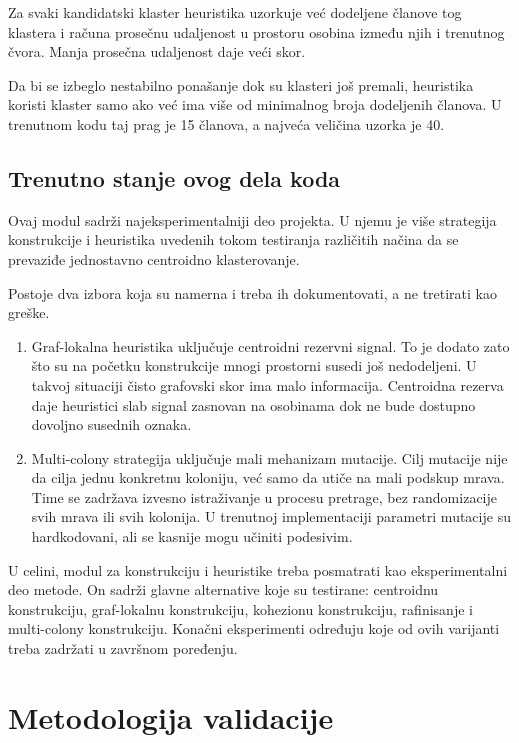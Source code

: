 \documentclass[11pt]{article}
\begin{document}
Za svaki kandidatski klaster heuristika uzorkuje već dodeljene članove tog klastera i računa prosečnu udaljenost u prostoru osobina između njih i trenutnog čvora. Manja prosečna udaljenost daje veći skor.

Da bi se izbeglo nestabilno ponašanje dok su klasteri još premali, heuristika koristi klaster samo ako već ima više od minimalnog broja dodeljenih članova. U trenutnom kodu taj prag je 15 članova, a najveća veličina uzorka je 40.

\subsection{Trenutno stanje ovog dela koda}
Ovaj modul sadrži najeksperimentalniji deo projekta. U njemu je više strategija konstrukcije i heuristika uvedenih tokom testiranja različitih načina da se prevaziđe jednostavno centroidno klasterovanje.

Postoje dva izbora koja su namerna i treba ih dokumentovati, a ne tretirati kao greške.
\begin{enumerate}
  \item Graf-lokalna heuristika uključuje centroidni rezervni signal. To je dodato zato što su na početku konstrukcije mnogi prostorni susedi još nedodeljeni. U takvoj situaciji čisto grafovski skor ima malo informacija. Centroidna rezerva daje heuristici slab signal zasnovan na osobinama dok ne bude dostupno dovoljno susednih oznaka.
  \item Multi-colony strategija uključuje mali mehanizam mutacije. Cilj mutacije nije da cilja jednu konkretnu koloniju, već samo da utiče na mali podskup mrava. Time se zadržava izvesno istraživanje u procesu pretrage, bez randomizacije svih mrava ili svih kolonija. U trenutnoj implementaciji parametri mutacije su hardkodovani, ali se kasnije mogu učiniti podesivim.
\end{enumerate}

U celini, modul za konstrukciju i heuristike treba posmatrati kao eksperimentalni deo metode. On sadrži glavne alternative koje su testirane: centroidnu konstrukciju, graf-lokalnu konstrukciju, kohezionu konstrukciju, rafinisanje i multi-colony konstrukciju. Konačni eksperimenti određuju koje od ovih varijanti treba zadržati u završnom poređenju.

\section{Metodologija validacije}
\label{sec:validation}
\end{document}
